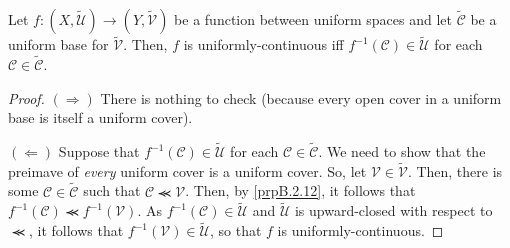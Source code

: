 \begin{prp}\label{prpB.3.4}
Let $f:(X,\widetilde{\mathcal{U}})\rightarrow (Y,\widetilde{\mathcal{V}})$ be a function between uniform spaces and let $\widetilde{\mathcal{C}}$ be a uniform base for $\widetilde{\mathcal{V}}$.  Then, $f$ is uniformly-continuous iff $f^{-1}(\mathcal{C})\in \widetilde{\mathcal{U}}$ for each $\mathcal{C}\in \widetilde{\mathcal{C}}$.
\begin{proof}
$(\Rightarrow )$ There is nothing to check (because every open cover in a uniform base is itself a uniform cover).

\blankline
\noindent
$(\Leftarrow )$ Suppose that $f^{-1}(\mathcal{C})\in \widetilde{\mathcal{U}}$ for each $\mathcal{C}\in \widetilde{\mathcal{C}}$.  We need to show that the preimave of \emph{every} uniform cover is a uniform cover.  So, let $\mathcal{V}\in \widetilde{\mathcal{V}}$.  Then, there is some $\mathcal{C}\in \widetilde{\mathcal{C}}$ such that $\mathcal{C}\llcurly \mathcal{V}$.  Then, by \cref{prpB.2.12}, it follows that $f^{-1}(\mathcal{C})\llcurly f^{-1}(\mathcal{V})$.  As $f^{-1}(\mathcal{C})\in \widetilde{\mathcal{U}}$ and $\widetilde{\mathcal{U}}$ is upward-closed with respect to $\llcurly$, it follows that $f^{-1}(\mathcal{V})\in \widetilde{\mathcal{U}}$, so that $f$ is uniformly-continuous.
\end{proof}
\end{prp}

